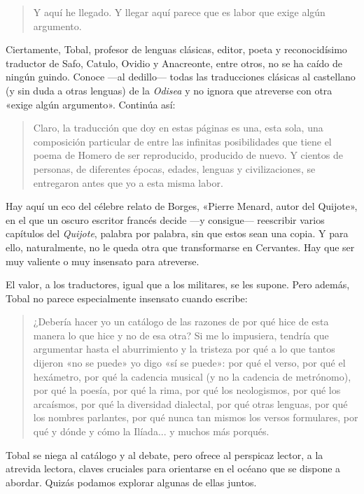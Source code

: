 \begin{quotation}
Y aquí he llegado. Y llegar aquí parece que es labor que exige algún argumento.
\end{quotation}

Ciertamente, Tobal, profesor de lenguas clásicas, editor, poeta y reconocidísimo traductor de Safo, Catulo, Ovidio y Anacreonte, entre otros, no se ha caído de ningún guindo. Conoce ---al dedillo--- todas las traducciones clásicas al castellano (y sin duda a otras lenguas) de la \emph{Odisea} y no ignora que atreverse con otra «exige algún argumento». Continúa así:

\begin{quotation}
Claro, la traducción que doy en estas páginas es una, esta sola, una composición particular de entre las infinitas posibilidades que tiene el poema de Homero de ser reproducido, producido de nuevo. Y cientos de personas, de diferentes épocas, edades, lenguas y civilizaciones, se entregaron antes que yo a esta misma labor.
\end{quotation}

Hay aquí un eco del célebre relato de Borges, «Pierre Menard, autor del Quijote», en el que un oscuro escritor francés decide ---y consigue--- reescribir varios capítulos del \emph{Quijote}, palabra por palabra, sin que estos sean una copia. Y para ello, naturalmente, no le queda otra que transformarse en Cervantes. Hay que ser muy valiente o muy insensato para atreverse.

El valor, a los traductores, igual que a los militares, se les supone. Pero además, Tobal no parece especialmente insensato cuando escribe:

\begin{quotation}
¿Debería hacer yo un catálogo de las razones de por qué hice de esta manera lo que hice y no de esa otra? Si me lo impusiera, tendría que argumentar hasta el aburrimiento y la tristeza por qué a lo que tantos dijeron «no se puede» yo digo «sí se puede»: por qué el verso, por qué el hexámetro, por qué la cadencia musical (y no la cadencia de metrónomo), por qué la poesía, por qué la rima, por qué los neologismos, por qué los arcaísmos, por qué la diversidad dialectal, por qué otras lenguas, por qué los nombres parlantes, por qué nunca tan mismos los versos formulares, por qué y dónde y cómo la Ilíada... y muchos más porqués.
\end{quotation}

Tobal se niega al catálogo y al debate, pero ofrece al perspicaz lector, a la atrevida lectora, claves cruciales para orientarse en el océano que se dispone a abordar. Quizás podamos explorar algunas de ellas juntos.


